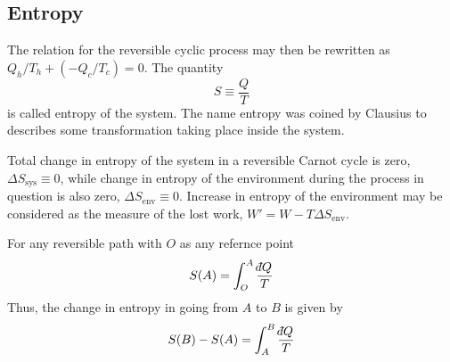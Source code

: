 \documentclass[../../../Main.tex]{subfiles}
\begin{document}
\subsection*{Entropy}
The relation for the reversible cyclic process may then be rewritten as $Q_h /T_h + (-Q_c /T_c ) = 0$. The quantity
\begin{equation*}
    S\equiv \frac{Q}{T}
\end{equation*}
is called entropy of the system. The name entropy was coined by Clausius to describes some transformation taking place inside the system.  

Total change in entropy of the system in a reversible Carnot cycle is zero, $\Delta S_{\text{sys}}\equiv0$, while change in entropy of the environment during the process in question is also zero, $\Delta S_{\text{env}}\equiv 0$. Increase in entropy of the environment may be considered as the measure of the lost work, $W'=W-T\Delta S_{\text{env}}$.

For any reversible path with $O$ as any refernce point 
\begin{equation*}
    S(A)=\int_O^A\frac{\dbar Q}{T}
\end{equation*}
Thus, the change in entropy in going from $A$ to $B$ is given by
\begin{equation*}
    S(B)-S(A)=\int_A^B\frac{\dbar Q}{T}
\end{equation*}
\end{document}
